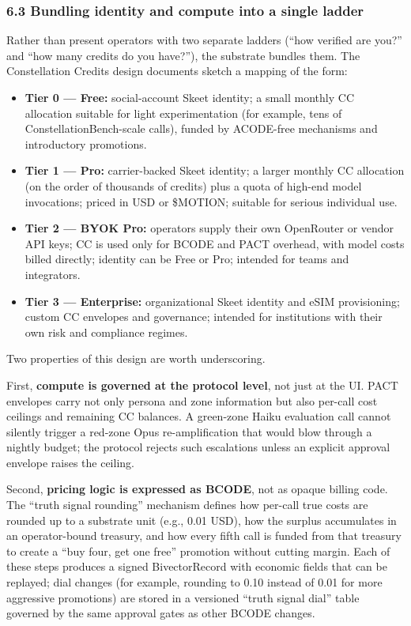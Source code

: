 \subsubsection{6.3 Bundling identity and compute into a single
ladder}\label{bundling-identity-and-compute-into-a-single-ladder}

Rather than present operators with two separate ladders (``how verified
are you?'' and ``how many credits do you have?''), the substrate bundles
them. The Constellation Credits design documents sketch a mapping of the
form:

\begin{itemize}
\tightlist
\item
  \textbf{Tier 0 --- Free:} social-account Skeet identity; a small
  monthly CC allocation suitable for light experimentation (for example,
  tens of ConstellationBench-scale calls), funded by ACODE-free
  mechanisms and introductory promotions.
\item
  \textbf{Tier 1 --- Pro:} carrier-backed Skeet identity; a larger
  monthly CC allocation (on the order of thousands of credits) plus a
  quota of high-end model invocations; priced in USD or \$MOTION;
  suitable for serious individual use.
\item
  \textbf{Tier 2 --- BYOK Pro:} operators supply their own OpenRouter or
  vendor API keys; CC is used only for BCODE and PACT overhead, with
  model costs billed directly; identity can be Free or Pro; intended for
  teams and integrators.
\item
  \textbf{Tier 3 --- Enterprise:} organizational Skeet identity and eSIM
  provisioning; custom CC envelopes and governance; intended for
  institutions with their own risk and compliance regimes.
\end{itemize}

Two properties of this design are worth underscoring.

First, \textbf{compute is governed at the protocol level}, not just at
the UI. PACT envelopes carry not only persona and zone information but
also per-call cost ceilings and remaining CC balances. A green-zone
Haiku evaluation call cannot silently trigger a red-zone Opus
re-amplification that would blow through a nightly budget; the protocol
rejects such escalations unless an explicit approval envelope raises the
ceiling.

Second, \textbf{pricing logic is expressed as BCODE}, not as opaque
billing code. The ``truth signal rounding'' mechanism defines how
per-call true costs are rounded up to a substrate unit (e.g., 0.01 USD),
how the surplus accumulates in an operator-bound treasury, and how every
fifth call is funded from that treasury to create a ``buy four, get one
free'' promotion without cutting margin. Each of these steps produces a
signed BivectorRecord with economic fields that can be replayed; dial
changes (for example, rounding to 0.10 instead of 0.01 for more
aggressive promotions) are stored in a versioned ``truth signal dial''
table governed by the same approval gates as other BCODE changes.

